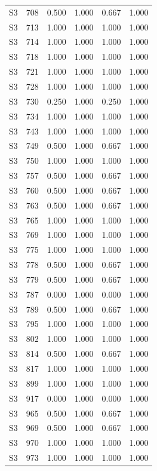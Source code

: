 \begin{tabular}{lrrrrr}
S3 & 708 & 0.500 & 1.000 & 0.667 & 1.000 \\
S3 & 713 & 1.000 & 1.000 & 1.000 & 1.000 \\
S3 & 714 & 1.000 & 1.000 & 1.000 & 1.000 \\
S3 & 718 & 1.000 & 1.000 & 1.000 & 1.000 \\
S3 & 721 & 1.000 & 1.000 & 1.000 & 1.000 \\
S3 & 728 & 1.000 & 1.000 & 1.000 & 1.000 \\
S3 & 730 & 0.250 & 1.000 & 0.250 & 1.000 \\
S3 & 734 & 1.000 & 1.000 & 1.000 & 1.000 \\
S3 & 743 & 1.000 & 1.000 & 1.000 & 1.000 \\
S3 & 749 & 0.500 & 1.000 & 0.667 & 1.000 \\
S3 & 750 & 1.000 & 1.000 & 1.000 & 1.000 \\
S3 & 757 & 0.500 & 1.000 & 0.667 & 1.000 \\
S3 & 760 & 0.500 & 1.000 & 0.667 & 1.000 \\
S3 & 763 & 0.500 & 1.000 & 0.667 & 1.000 \\
S3 & 765 & 1.000 & 1.000 & 1.000 & 1.000 \\
S3 & 769 & 1.000 & 1.000 & 1.000 & 1.000 \\
S3 & 775 & 1.000 & 1.000 & 1.000 & 1.000 \\
S3 & 778 & 0.500 & 1.000 & 0.667 & 1.000 \\
S3 & 779 & 0.500 & 1.000 & 0.667 & 1.000 \\
S3 & 787 & 0.000 & 1.000 & 0.000 & 1.000 \\
S3 & 789 & 0.500 & 1.000 & 0.667 & 1.000 \\
S3 & 795 & 1.000 & 1.000 & 1.000 & 1.000 \\
S3 & 802 & 1.000 & 1.000 & 1.000 & 1.000 \\
S3 & 814 & 0.500 & 1.000 & 0.667 & 1.000 \\
S3 & 817 & 1.000 & 1.000 & 1.000 & 1.000 \\
S3 & 899 & 1.000 & 1.000 & 1.000 & 1.000 \\
S3 & 917 & 0.000 & 1.000 & 0.000 & 1.000 \\
S3 & 965 & 0.500 & 1.000 & 0.667 & 1.000 \\
S3 & 969 & 0.500 & 1.000 & 0.667 & 1.000 \\
S3 & 970 & 1.000 & 1.000 & 1.000 & 1.000 \\
S3 & 973 & 1.000 & 1.000 & 1.000 & 1.000 \\

\end{tabular}
